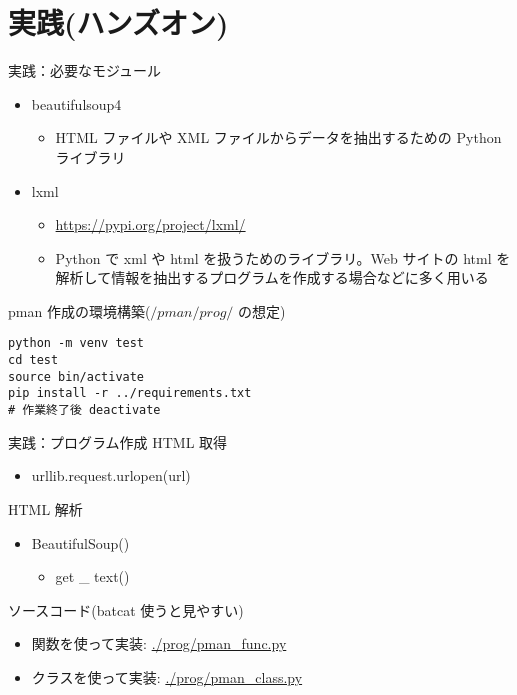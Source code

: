 \documentclass[compress,dvipdfmx,11pt]{beamer}
\begin{document}
\section{実践(ハンズオン)}
\label{sec:org72e1aae}
\begin{frame}[label={sec:org6c5c650},fragile]{実践：必要なモジュール}
 \begin{itemize}
\item beautifulsoup4
\begin{itemize}
\item HTML ファイルや XML ファイルからデータを抽出するための Python ライブラリ
\end{itemize}
\item lxml
\begin{itemize}
\item \url{https://pypi.org/project/lxml/}
\item Python で xml や html を扱うためのライブラリ。Web サイトの html を
解析して情報を抽出するプログラムを作成する場合などに多く用いる
\end{itemize}
\end{itemize}

pman 作成の環境構築(\(/pman/prog/\) の想定)
\begin{verbatim}
python -m venv test
cd test
source bin/activate
pip install -r ../requirements.txt
# 作業終了後 deactivate
\end{verbatim}
\end{frame}

\begin{frame}[label={sec:org4f5dc3b}]{実践：プログラム作成}
HTML 取得
\begin{itemize}
\item urllib.request.urlopen(url)
\end{itemize}

HTML 解析
\begin{itemize}
\item BeautifulSoup()
\begin{itemize}
\item get \_ text()
\end{itemize}
\end{itemize}

ソースコード(\alert{batcat} 使うと見やすい)
\begin{itemize}
\item 関数を使って実装:  \url{./prog/pman\_func.py}
\item クラスを使って実装: \url{./prog/pman\_class.py}
\end{itemize}
\end{frame}
\end{document}
